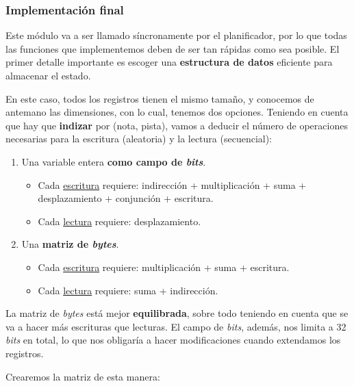 \subsubsection{Implementación final}

Este módulo va a ser llamado síncronamente por el planificador, por lo que todas las funciones que implementemos deben de ser tan rápidas como sea posible. El primer detalle importante es escoger una \textbf{estructura de datos} eficiente para almacenar el estado.

En este caso, todos los registros tienen el mismo tamaño, y conocemos de antemano las dimensiones, con lo cual, tenemos dos opciones. Teniendo en cuenta que hay que \textbf{indizar} por (nota, pista), vamos a deducir el número de operaciones necesarias para la escritura (aleatoria) y la lectura (secuencial):

\begin{enumerate}
	\item Una variable entera \textbf{como campo de \textit{bits}}.
	\begin{itemize}
		\item Cada \underline{escritura} requiere: indirección + multiplicación + suma + desplazamiento + conjunción + escritura. 
		\item Cada \underline{lectura} requiere: desplazamiento.
	\end{itemize}
	
	\item Una \textbf{matriz de \textit{bytes}}.
	
	\begin{itemize}
		\item Cada \underline{escritura} requiere: multiplicación + suma + escritura.
		\item Cada \underline{lectura} requiere: suma + indirección.
	\end{itemize}
\end{enumerate}

La matriz de \textit{bytes} está mejor \textbf{equilibrada}, sobre todo teniendo en cuenta que se va a hacer más escrituras que lecturas. El campo de \textit{bits}, además, nos limita a 32 \textit{bits} en total, lo que nos obligaría a hacer modificaciones cuando extendamos los registros.

Crearemos la matriz de esta manera:

\smallskip

